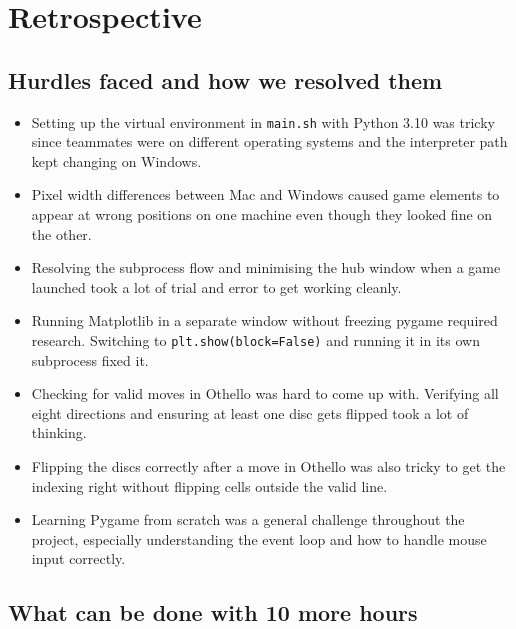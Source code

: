 \documentclass[12pt,a4paper]{article}
\begin{document}
\section{Retrospective}
\label{sec:retro}

\subsection{Hurdles faced and how we resolved them}
\begin{itemize}
    \item Setting up the virtual environment in \texttt{main.sh} with Python 3.10 was tricky since teammates were on different operating systems and the interpreter path kept changing on Windows.
    \item Pixel width differences between Mac and Windows caused game elements to appear at wrong positions on one machine even though they looked fine on the other.
    \item Resolving the subprocess flow and minimising the hub window when a game launched took a lot of trial and error to get working cleanly.
    \item Running Matplotlib in a separate window without freezing pygame required research. Switching to \texttt{plt.show(block=False)} and running it in its own subprocess fixed it.
    \item Checking for valid moves in Othello was hard to come up with. Verifying all eight directions and ensuring at least one disc gets flipped took a lot of thinking.
    \item Flipping the discs correctly after a move in Othello was also tricky to get the indexing right without flipping cells outside the valid line.
    \item Learning Pygame from scratch was a general challenge throughout the project, especially understanding the event loop and how to handle mouse input correctly.
\end{itemize}




\subsection{What can be done with 10 more hours}
\end{document}
